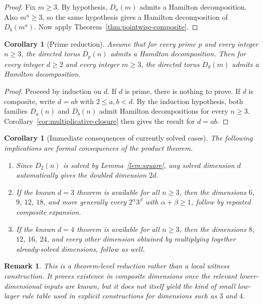 \documentclass[11pt]{article}
\newtheorem{corollary}[theorem]{Corollary}
\newtheorem{remark}[theorem]{Remark}
\newcommand{\torus}[2]{D_{#1}(#2)}
\begin{document}
\begin{proof}
Fix $m\ge 3$.
By hypothesis, $\torus{a}{m}$ admits a Hamilton decomposition.
Also $m^a\ge 3$, so the same hypothesis gives a Hamilton decomposition of
$\torus{b}{m^a}$.
Now apply Theorem~\ref{thm:pointwise-composite}.
\end{proof}

\begin{corollary}[Prime reduction]
\label{cor:prime-reduction}
Assume that for every prime $p$ and every integer $n\ge 3$, the directed torus
$\torus{p}{n}$ admits a Hamilton decomposition.
Then for every integer $d\ge 2$ and every integer $m\ge 3$, the directed torus
$\torus{d}{m}$ admits a Hamilton decomposition.
\end{corollary}

\begin{proof}
Proceed by induction on $d$.
If $d$ is prime, there is nothing to prove.
If $d$ is composite, write $d=ab$ with $2\le a,b<d$.
By the induction hypothesis, both families $\torus{a}{n}$ and $\torus{b}{n}$
admit Hamilton decompositions for every $n\ge 3$.
Corollary~\ref{cor:multiplicative-closure} then gives the result for $d=ab$.
\end{proof}

\begin{corollary}[Immediate consequences of currently solved cases]
\label{cor:examples}
The following implications are formal consequences of the product theorem.
\begin{enumerate}
    \item Since $\torus{2}{n}$ is solved by Lemma~\ref{lem:square}, any solved
    dimension $d$ automatically gives the doubled dimension $2d$.
    \item If the known $d=3$ theorem is available for all $n\ge 3$, then the
    dimensions $6$, $9$, $12$, $18$, and more generally every
    $2^{\alpha}3^{\beta}$ with $\alpha+\beta\ge 1$, follow by repeated
    composite expansion.
    \item If the known $d=4$ theorem is available for all $n\ge 3$, then the
    dimensions $8$, $12$, $16$, $24$, and every other dimension obtained by
    multiplying together already-solved dimensions, follow as well.
\end{enumerate}
\end{corollary}

\begin{remark}
This is a theorem-level reduction rather than a local witness construction.
It proves existence in composite dimensions once the relevant lower-dimensional
inputs are known, but it does not itself yield the kind of small low-layer rule
table used in explicit constructions for dimensions such as $3$ and $4$.
\end{remark}
\end{document}
